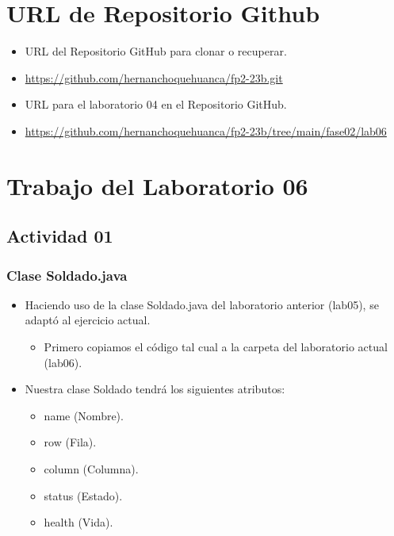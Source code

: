 \documentclass{article}
\begin{document}
	\section{URL de Repositorio Github}
	\begin{itemize}
		\item URL del Repositorio GitHub para clonar o recuperar.
        \item \url{https://github.com/hernanchoquehuanca/fp2-23b.git}
		\item URL para el laboratorio 04 en el Repositorio GitHub.
		\item \url{https://github.com/hernanchoquehuanca/fp2-23b/tree/main/fase02/lab06}
	\end{itemize}
	
	\section{Trabajo del Laboratorio 06}
        
        


    \subsection{Actividad 01}
    
        \subsubsection{Clase Soldado.java}
        \begin{itemize}	
            \item Haciendo uso de la clase Soldado.java del laboratorio anterior (lab05), se adaptó al ejercicio actual.
            \begin{itemize}
                \item Primero copiamos el código tal cual a la carpeta del laboratorio actual (lab06).
            \end{itemize}
            \item Nuestra clase Soldado tendrá los siguientes atributos:
            \begin{itemize}
                \item name (Nombre).
                \item row (Fila).
                \item column (Columna).
                \item status (Estado).
                \item health (Vida).
            \end{itemize}
            
        \end{itemize}
        
\end{document}
